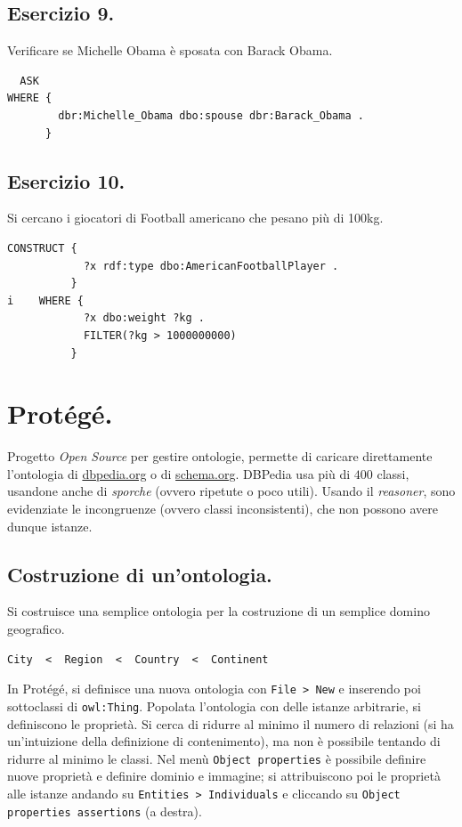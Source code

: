 \documentclass[11pt]{article}
\begin{document}
\subsection*{Esercizio 9.}
Verificare se Michelle Obama è sposata con Barack Obama.
\begin{verbatim}
  ASK
WHERE {
        dbr:Michelle_Obama dbo:spouse dbr:Barack_Obama .
      }
\end{verbatim}

\subsection*{Esercizio 10.}
Si cercano i giocatori di Football americano che pesano più di 100kg.
\begin{verbatim}
CONSTRUCT {
            ?x rdf:type dbo:AmericanFootballPlayer .
          }
i    WHERE {
            ?x dbo:weight ?kg .
            FILTER(?kg > 1000000000)
          }
\end{verbatim}


\section{Protégé.}
Progetto \textit{Open Source} per gestire ontologie, permette di caricare direttamente l'ontologia di \url{dbpedia.org} o di \url{schema.org}.
DBPedia usa più di $400$ classi, usandone anche di \textit{sporche} (ovvero ripetute o poco utili).
Usando il \textit{reasoner}, sono evidenziate le incongruenze (ovvero classi inconsistenti), che non possono avere dunque istanze.

\subsection*{Costruzione di un'ontologia.}
Si costruisce una semplice ontologia per la costruzione di un semplice domino geografico.
\begin{verbatim}
City  <  Region  <  Country  <  Continent
\end{verbatim}
In Protégé, si definisce una nuova ontologia con \verb|File > New| e inserendo poi sottoclassi di \verb|owl:Thing|.
Popolata l'ontologia con delle istanze arbitrarie, si definiscono le proprietà.
Si cerca di ridurre al minimo il numero di relazioni (si ha un'intuizione della definizione di contenimento), ma non è possibile tentando di ridurre al minimo le classi.
Nel menù \verb|Object properties| è possibile definire nuove proprietà e definire dominio e immagine; si attribuiscono poi le proprietà alle istanze andando su \verb|Entities > Individuals| e cliccando su \verb|Object properties assertions| (a destra).
\end{document}
